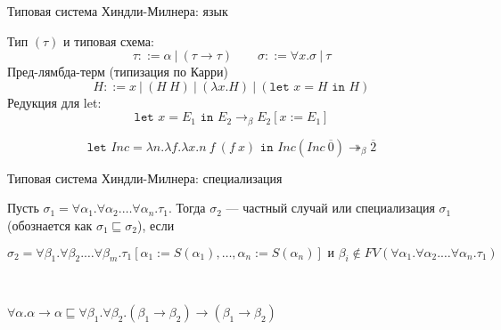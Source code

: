 \documentclass[aspectratio=169]{beamer}
\begin{document}
\begin{frame}{Типовая система Хиндли-Милнера: язык}
\begin{dfn}Тип $(\tau)$ и типовая схема: $$\tau ::= \alpha\ |\ (\tau\rightarrow\tau)\quad\quad\sigma ::= \forall x.\sigma\ |\ \tau$$%
Пред-лямбда-терм (типизация по Карри) $$H ::= x\ |\ (H\ H)\ |\ (\lambda x.H)\ |\ (\texttt{let }x=H\texttt{ in }H)$$%
Редукция для let:
$$\texttt{let }x=E_1\texttt{ in }E_2\rightarrow_\beta E_2[x := E_1]$$
\end{dfn}

\begin{exm}
$$\texttt{let }Inc=\lambda n.\lambda f.\lambda x.n\ f\ (f\ x)\texttt{ in }Inc(Inc\ \overline{0})\twoheadrightarrow_\beta \overline{2}$$
\end{exm}
\end{frame}

\begin{frame}{Типовая система Хиндли-Милнера: специализация}
\begin{dfn}

Пусть $\sigma_1 = \forall \alpha_1. \forall \alpha_2. \dots \forall \alpha_n. \tau_1$.
Тогда $\sigma_2$ --- частный случай или специализация $\sigma_1$ (обознается как $\sigma_1 \sqsubseteq \sigma_2$), если

$$\sigma_2 =  \forall \beta_1. \forall \beta_2. \dots \forall \beta_m. \tau_1[\alpha_1 := S(\alpha_1),\dots,\alpha_n := S(\alpha_n)]
\text{ и } \beta_i \notin FV(\forall \alpha_1.\forall\alpha_2.\dots\forall\alpha_n.\tau_1)$$

\end{dfn}

\begin{exm}\

$\forall \alpha.\alpha \rightarrow \alpha
\sqsubseteq
\forall \beta_1.\forall \beta_2.(\beta_1 \rightarrow \beta_2) \rightarrow (\beta_1 \rightarrow \beta_2)$
\end{exm}
\end{frame}
\end{document}
